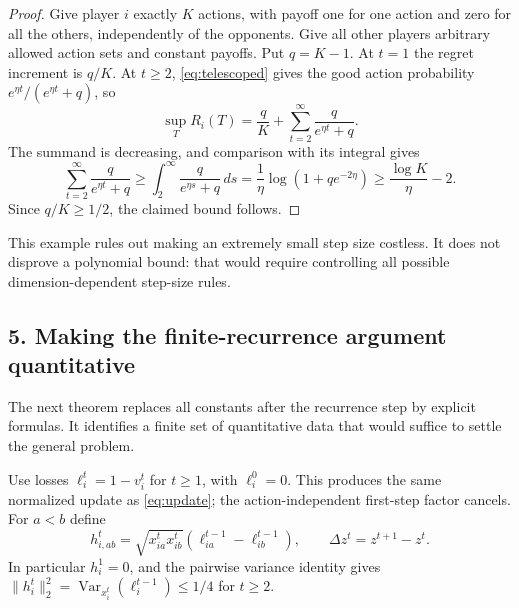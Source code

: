 \documentclass[11pt]{article}
\newcommand{\Var}{\operatorname{Var}}
\newcommand{\norm}[1]{\lVert #1\rVert}
\begin{document}
\begin{proof}
Give player $i$ exactly $K$ actions, with payoff one for one action and zero
for all the others, independently of the opponents. Give all other players
arbitrary allowed action sets and constant payoffs. Put $q=K-1$.
At $t=1$ the regret increment is $q/K$. At $t\geq2$,
\eqref{eq:telescoped} gives the good action probability
$e^{\eta t}/(e^{\eta t}+q)$, so
\[
 \sup_T R_i(T)=\frac qK+\sum_{t=2}^\infty\frac q{e^{\eta t}+q}.
\]
The summand is decreasing, and comparison with its integral gives
\[
 \sum_{t=2}^\infty\frac q{e^{\eta t}+q}
 \geq\int_2^\infty\frac q{e^{\eta s}+q}\,ds
 =\frac1\eta\log(1+q e^{-2\eta})
 \geq\frac{\log K}{\eta}-2.
\]
Since $q/K\geq1/2$, the claimed bound follows.
\end{proof}
This example rules out making an extremely small step size costless. It
does not disprove a polynomial bound: that would require controlling all
possible dimension-dependent step-size rules.

\subsection*{5. Making the finite-recurrence argument quantitative}
The next theorem replaces all constants after the recurrence step by
explicit formulas. It identifies a finite set of quantitative data that
would suffice to settle the general problem.

Use losses $\ell_i^t=1-v_i^t$ for $t\geq1$, with $\ell_i^0=0$.
This produces the same normalized update as \eqref{eq:update}; the
action-independent first-step factor cancels. For $a<b$ define
\[
 h_{i,ab}^t=\sqrt{x_{ia}^tx_{ib}^t}
 (\ell_{ia}^{t-1}-\ell_{ib}^{t-1}),\qquad
 \Delta z^t=z^{t+1}-z^t.
\]
In particular $h_i^1=0$, and the pairwise variance identity gives
$\norm{h_i^t}_2^2=\Var_{x_i^t}(\ell_i^{t-1})\leq1/4$ for $t\geq2$.
\end{document}
